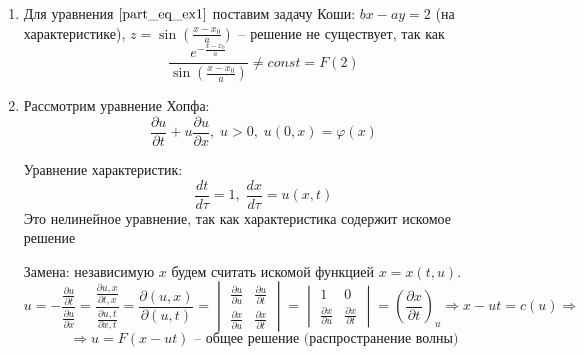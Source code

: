 \begin{enumerate}
    \item

    Для уравнения $\eqref{part_eq_ex1}$ поставим задачу Коши: $bx - ay = 2$ (на характеристике), $z = \sin (\frac{x - x_0}{a})$ -- решение не существует, так как 
    \begin{equation*}
        \frac{e^{-\frac{x - x_0}{a}}}{\sin \left( \frac{x - x_0}{a} \right)} \neq const = F(2)
    \end{equation*}

    \item Рассмотрим уравнение Хопфа:
    \begin{equation*}
        \frac{\partial u}{\partial t} + u \frac{\partial u}{\partial x}, \; u > 0, \; u(0, x) = \varphi(x)
    \end{equation*}

    Уравнение характеристик:
    \begin{equation*}
    	\frac{dt}{d \tau} = 1, \; \frac{dx}{d \tau} = u(x, t)
    \end{equation*}
    \noindent  Это нелинейное уравнение, так как характеристика содержит искомое решение
    
    Замена: независимую $x$ будем считать искомой функцией $x = x(t, u)$.
    \begin{equation*}
    	u = - \frac{\frac{\partial u}{\partial t}}{\frac{\partial u}{\partial x}}  = \frac{\frac{\partial u, x}{\partial t, x}}{\frac{\partial u, t}{\partial x, t}} = \frac{\partial (u, x)}{\partial (u, t)} = 
    	\begin{vmatrix}
    		\frac{\partial u}{\partial u} & \frac{\partial u}{\partial t} \\
    		\frac{\partial x}{\partial u} & \frac{\partial x}{\partial t}
    	\end{vmatrix} = 
    	\begin{vmatrix}
    		1 & 0 \\
    		\frac{\partial x}{\partial u} & \frac{\partial x}{\partial t}
    	\end{vmatrix} = \left( \frac{\partial x}{\partial t} \right)_{u} \Rightarrow x - ut = c(u) \Rightarrow 
    \end{equation*}
    \begin{equation*}
    	\Rightarrow u = F(x - ut) \text{ -- общее решение (распространение волны)}
    \end{equation*}
    
\end{enumerate}
